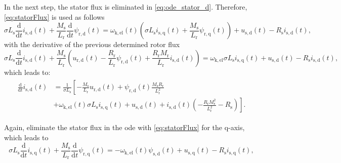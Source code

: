 \begin{solutionblock}
    In the next step, the stator flux is eliminated in \eqref{eq:ode_stator_d}. Therefore, \eqref{eq:statorFlux}  is used as follows
    \begin{equation}
        \sigma L_{\mathrm{s}} \frac{\mathrm{d}}{\mathrm{d}t} i_{\mathrm{s,d}}(t) + \frac{M_{\mathrm{s}}}{L_{\mathrm{r}}} \frac{\mathrm{d}}{\mathrm{d}t}\psi_{\mathrm{r,d}}(t) = \omega_{\mathrm{k,el}}(t) \left(\sigma L_{\mathrm{s}} i_{\mathrm{s,q}}(t) + \frac{M_{\mathrm{s}}}{L_{\mathrm{r}}} \psi_{\mathrm{r,q}}(t) \right) + u_{\mathrm{s,d}}(t) - R_{\mathrm{s}} i_{\mathrm{s,d}}(t),
    \end{equation}
    with the derivative of the previous determined rotor flux
    \begin{equation}
        \sigma L_{\mathrm{s}} \frac{\mathrm{d}}{\mathrm{d}t} i_{\mathrm{s,d}}(t) + \frac{M_{\mathrm{s}}}{L_{\mathrm{r}}} \left(u_{\mathrm{r,d}}(t) - \frac{R_{\mathrm{r}}}{L_{\mathrm{r}}} \psi_{\mathrm{r,d}}(t) + \frac{R_{\mathrm{r}}M_{\mathrm{r}}}{L_{\mathrm{r}}}i_{\mathrm{s,d}}(t) \right)
        =
        \omega_{\mathrm{k,el}} \sigma L_{\mathrm{s}} i_{\mathrm{s,q}}(t) + u_{\mathrm{s,d}}(t) - R_{\mathrm{s}} i_{\mathrm{s,d}}(t),
    \end{equation}
    which leads to:
    \begin{align}
        \begin{split}
            \frac{\mathrm{d}}{\mathrm{d}t} i_{\mathrm{s,d}}(t) &= \frac{1}{\sigma L_{\mathrm{s}}}
            \left[ 
                -\frac{M_{\mathrm{s}}}{L_{\mathrm{r}}} u_{\mathrm{r,d}}(t) + \psi_{\mathrm{r,d}}(t) \frac{M_{\mathrm{s}}R_{\mathrm{r}}}{L_{\mathrm{r}}^{2}} \right.\\
                &+ \left. \omega_{\mathrm{k,el}}(t) \sigma L_{\mathrm{s}} i_{\mathrm{s,q}}(t) + u_{\mathrm{s,d}}(t) + i_{\mathrm{s,d}}(t) \left(-\frac{R_{\mathrm{r}}M_{\mathrm{s}}^2}{L_{\mathrm{r}}^2} - R_{\mathrm{s}} \right)
            \right].
        \end{split}
    \end{align}


    Again, eliminate the stator flux in the ode with \eqref{eq:statorFlux} for the q-axis, which leads to
    \begin{equation}
        \sigma L_{\mathrm{s}} \frac{\mathrm{d}}{\mathrm{d}t} i_{\mathrm{s,q}}(t) + \frac{M_{\mathrm{s}}}{L_{\mathrm{r}}} \frac{\mathrm{d}}{\mathrm{d}t} \psi_{\mathrm{r,q}}(t)
        =
        - \omega_{\mathrm{k,el}}(t) \psi_{\mathrm{s,d}}(t) + u_{\mathrm{s,q}}(t) - R_{\mathrm{s}} i_{\mathrm{s,q}}(t),
    \end{equation}


\end{solutionblock}
